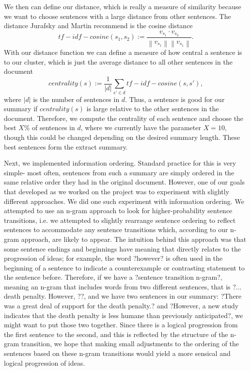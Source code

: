 \documentclass[12pt]{article}
\theoremstyle{plain}
\theoremstyle{definition}
\theoremstyle{remark}
\theoremstyle{plain}
\newcommand{\norm}[1]{\left\lVert #1 \right\rVert}
\begin{document}
We then can define our distance, which is really a measure of similarity because we want to choose sentences with a large distance from other sentences. The distance Jurafsky and Martin recommend is the cosine distance
$$tf-idf-cosine(s_1,s_2) := \frac{ v_{s_1} \cdot v_{s_2}}{\norm{v_{s_1}}\norm{v_{s_1}}}.$$
With our distance function we can define a measure of how central a sentence is to our cluster, which is just the average distance to all other sentences in the document
$$centrality(s) := \frac{1}{|d|}\sum_{s'\in d} tf-idf-cosine(s,s'),$$
where $|d|$ is the number of sentences in $d$. Thus, a sentence is good for our summary if $centrality(s)$ is large relative to the other sentences in the document. Therefore, we compute the centrality of each sentence and choose the best $X$\% of sentences in $d$, where we currently have the parameter $X=10$, though this could be changed depending on the desired summary length. These best sentences form the extract summary.



	Next, we implemented information ordering. Standard practice for this is very simple- most often, sentences from such a summary are simply ordered in the same relative order they had in the original document. However, one of our goals that developed as we worked on the project was to experiment with slightly different approaches. We did one such experiment with information ordering. We attempted to use an n-gram approach to look for higher-probability sentence transitions, i.e. we attempted to slightly rearrange sentence ordering to reflect sentences to accommodate any sentence transitions which, according to our n-gram approach, are likely to appear. 
The intuition behind this approach was that some sentence endings and beginnings have meaning that directly relates to the progression of ideas; for example, the word ?however? is often used in the beginning of a sentence to indicate a counterexample or contrasting statement to the sentence before. Therefore, if we have a ?sentence transition n-gram?, meaning an n-gram that includes words from two different sentences, that is ?... death penalty. However, ??, and we have two sentences in our summary: ?There was a great deal of support for the death penalty.? and ?However, a new study indicates that the death penalty is less humane than previously anticipated?, we might want to put those two together. Since there is a logical progression from the first sentence to the second, and this is reflected by the structure of the n-gram transition, we hope that making small adjustments to the ordering of the sentences based on these n-gram transitions would yield a more sensical and logical progression of ideas. 
\end{document}
